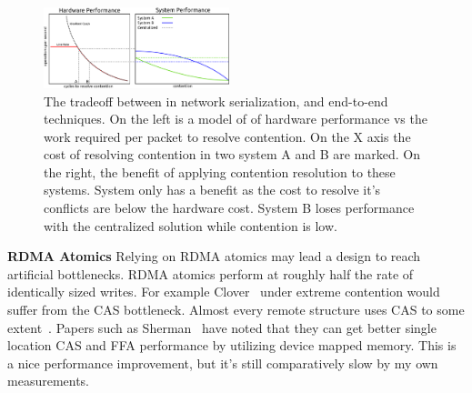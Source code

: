 \begin{figure}
    \includegraphics[width=0.48\textwidth]{fig/in_network_tradeoff.pdf}

    \caption{The tradeoff between in network serialization, and end-to-end
    techniques. On the left is a model of of hardware performance vs the work
    required per packet to resolve contention. On the X axis the cost of
    resolving contention in two system A and B are marked. On the right, the
    benefit of applying contention resolution to these systems. System only has
    a benefit as the cost to resolve it's conflicts are below the hardware cost.
    System B loses performance with the centralized solution while contention is
    low.}

    \label{fig:middlebox_model}
\end{figure}


\textbf{RDMA Atomics} Relying on RDMA atomics may lead a design to reach
artificial bottlenecks. RDMA atomics perform at roughly half the rate of
identically sized writes. For example Clover~\cite{clover} under extreme
contention would suffer from the CAS bottleneck. Almost every remote structure
uses CAS to some extent~. Papers such as
Sherman~\cite{sherman} have noted that they can get better single location CAS
and FFA performance by utilizing device mapped memory. This is a nice
performance improvement, but it's still comparatively slow by my own
measurements.

